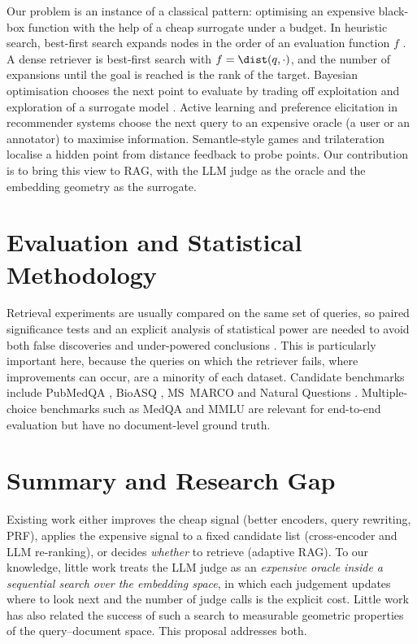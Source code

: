 Our problem is an instance of a classical pattern: optimising an expensive black-box function with the help of a cheap surrogate under a budget. In heuristic search, best-first search expands nodes in the order of an evaluation function $f$ \citep{pearl1984heuristics}. A dense retriever is best-first search with $f=\dist(q,\cdot)$, and the number of expansions until the goal is reached is the rank of the target. Bayesian optimisation chooses the next point to evaluate by trading off exploitation and exploration of a surrogate model \citep{shahriari2016bayesopt}. Active learning \citep{settles2009active} and preference elicitation in recommender systems \citep{rubens2015active} choose the next query to an expensive oracle (a user or an annotator) to maximise information. Semantle-style games and trilateration localise a hidden point from distance feedback to probe points. Our contribution is to bring this view to RAG, with the LLM judge as the oracle and the embedding geometry as the surrogate.

\section{Evaluation and Statistical Methodology}

Retrieval experiments are usually compared on the same set of queries, so paired significance tests and an explicit analysis of statistical power are needed to avoid both false discoveries and under-powered conclusions \citep{smucker2007comparison,sakai2016statistical}. This is particularly important here, because the queries on which the retriever fails, where improvements can occur, are a minority of each dataset. Candidate benchmarks include PubMedQA \citep{jin2019pubmedqa}, BioASQ \citep{tsatsaronis2015bioasq,nentidis2023bioasq11}, MS~MARCO \citep{nguyen2016msmarco} and Natural Questions \citep{kwiatkowski2019nq}. Multiple-choice benchmarks such as MedQA \citep{jin2021medqa} and MMLU \citep{hendrycks2021mmlu} are relevant for end-to-end evaluation but have no document-level ground truth.

\section{Summary and Research Gap}

Existing work either improves the cheap signal (better encoders, query rewriting, PRF), applies the expensive signal to a fixed candidate list (cross-encoder and LLM re-ranking), or decides \emph{whether} to retrieve (adaptive RAG). To our knowledge, little work treats the LLM judge as an \emph{expensive oracle inside a sequential search over the embedding space}, in which each judgement updates where to look next and the number of judge calls is the explicit cost. Little work has also related the success of such a search to measurable geometric properties of the query--document space. This proposal addresses both.
